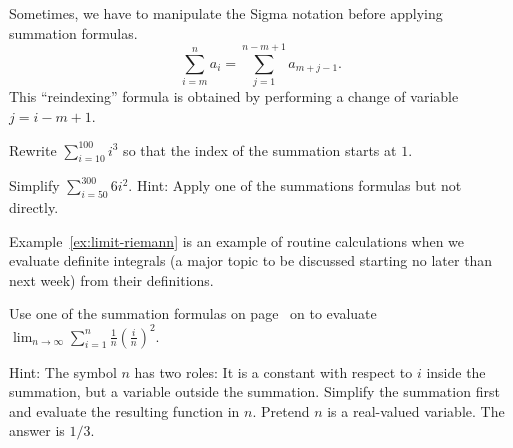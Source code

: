 \documentclass[../main.tex]{subfiles}
\begin{document}
  Sometimes, we have to manipulate the Sigma notation before applying summation formulas.
  \begin{equation} \label{eq:summation-reindex}
    \sum_{i=m}^{n} a_{i} = \sum_{j = 1}^{n - m + 1} a_{m+j-1}.
  \end{equation}
  This ``reindexing'' formula is obtained by performing a change of variable \(j = i - m + 1\).
  \begin{example}
    Rewrite \(\sum_{i=10}^{100} i^{3}\) so that the index of the summation starts at \(1\).
  \end{example}

  \begin{example} 
    Simplify \(\sum_{i=50}^{300} 6 i^{2}\).  {\footnotesize Hint: Apply one of the summations formulas but not directly.}
  \end{example}
  \clearpage

  Example~\ref{ex:limit-riemann} is an example of routine calculations when we evaluate definite integrals (a major topic to be discussed starting no later than next week) from their definitions.
  \begin{example} \label{ex:limit-riemann}
    Use one of the summation formulas on page~\pageref{formula:summations} on to evaluate \(\lim_{n \to \infty} \sum_{i=1}^{n} \frac{1}{n} \left( \frac{i}{n} \right)^{2}\).  

    {\footnotesize Hint: The symbol \(n\) has two roles: It is a constant with respect to \(i\) inside the summation, but a variable outside the summation. Simplify the summation first and evaluate the resulting function in \(n\). Pretend \(n\) is a real-valued variable. The answer is \(1/3\).}
  \end{example}
\end{document}
